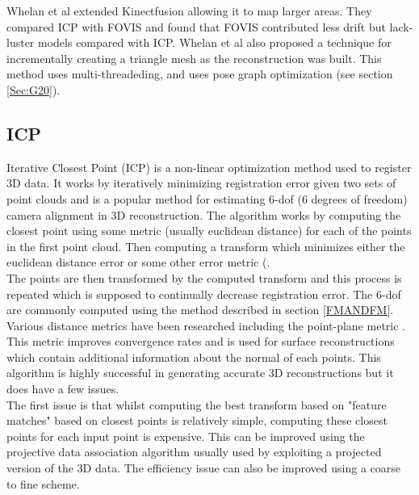 Whelan et al \cite{Whelan12Kintinuous} extended Kinectfusion allowing it to map larger areas. They compared ICP with FOVIS and found that FOVIS contributed less drift but lack-luster models compared with ICP. Whelan et al also proposed a technique for incrementally creating a triangle mesh as the reconstruction was built. This method uses multi-threadeding, and uses pose graph optimization (see section \ref{Sec:G20}).



\subsection{ICP}

\label{ICPSection}

Iterative Closest Point (ICP) \cite{Besl92Method,Rusinkiewicz01Efficient,Segal09Generalized} is a non-linear optimization method used to register 3D data. It works by iteratively minimizing registration error given two sets of point clouds and is a popular method for estimating 6-dof (6 degrees of freedom) camera alignment in 3D reconstruction. The algorithm works by computing the closest point using some metric (usually euclidean distance) for each of the points in the first point cloud. Then computing a transform which minimizes either the euclidean distance error or some other error metric (\cite{Steinbrucker11Real,Tykkala11Direct,Kerl13Robust,Chen92Object,Stuckler12Robust}. \\

The points are then transformed by the computed transform and this process is repeated which is supposed to continually decrease registration error. The 6-dof are commonly computed using the method described in section \ref{FMANDFM}. Various distance metrics have been researched including the point-plane metric \cite{Chen92Object}. This metric improves convergence rates and is used for surface reconstructions which contain additional information about the normal of each points. This algorithm is highly successful in generating accurate 3D reconstructions but it does have a few issues. \\

The first issue is that whilst computing the best transform based on "feature matches" based on closest points is relatively simple, computing these closest points for each input point is expensive. This can be improved using the projective data association algorithm \cite{Blais95Registering} usually used by exploiting a projected version of the 3D data. The efficiency issue can also be improved using a coarse to fine scheme. \\

